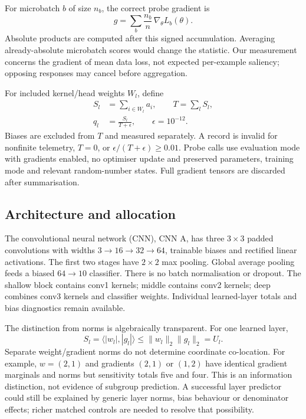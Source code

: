 For microbatch $b$ of size $n_b$, the correct probe gradient is
\begin{equation}
g=\sum_b\frac{n_b}{n}\,\nabla_\theta L_b(\theta).
\label{eq:microbatch}
\tag{2}\end{equation}
Absolute products are computed after this signed accumulation. Averaging already-absolute microbatch scores would change the statistic. Our measurement concerns the gradient of mean data loss, not expected per-example saliency; opposing responses may cancel before aggregation.

For included kernel/head weights $W_l$, define
\begin{equation}
\begin{aligned}
S_l&=\sum_{i\in W_l}a_i,\qquad T=\sum_lS_l,\\
q_l&=\frac{S_l}{T+\epsilon},\qquad\epsilon=10^{-12}.
\end{aligned}
\label{eq:shares}
\tag{3}\end{equation}
Biases are excluded from $T$ and measured separately. A record is invalid for nonfinite telemetry, $T=0$, or $\epsilon/(T+\epsilon)\geq0.01$. Probe calls use evaluation mode with gradients enabled, no optimiser update and preserved parameters, training mode and relevant random-number states. Full gradient tensors are discarded after summarisation.

\subsection{Architecture and allocation}
The convolutional neural network (CNN), CNN A, has three $3\times3$ padded convolutions with widths $3\!\rightarrow\!16\!\rightarrow\!32\!\rightarrow\!64$, trainable biases and rectified linear activations. The first two stages have $2\times2$ max pooling. Global average pooling feeds a biased $64\!\rightarrow\!10$ classifier. There is no batch normalisation or dropout. The shallow block contains conv1 kernels; middle contains conv2 kernels; deep combines conv3 kernels and classifier weights. Individual learned-layer totals and bias diagnostics remain available.

The distinction from norms is algebraically transparent. For one learned layer,
\begin{equation}
S_l=\langle|w_l|,|g_l|\rangle
\leq\|w_l\|_2\|g_l\|_2=U_l.
\label{eq:norm}
\tag{4}\end{equation}
Separate weight/gradient norms do not determine coordinate co-location. For example, $w=(2,1)$ and gradients $(2,1)$ or $(1,2)$ have identical gradient marginals and norms but sensitivity totals five and four. This is an information distinction, not evidence of subgroup prediction. A successful layer predictor could still be explained by generic layer norms, bias behaviour or denominator effects; richer matched controls are needed to resolve that possibility.


